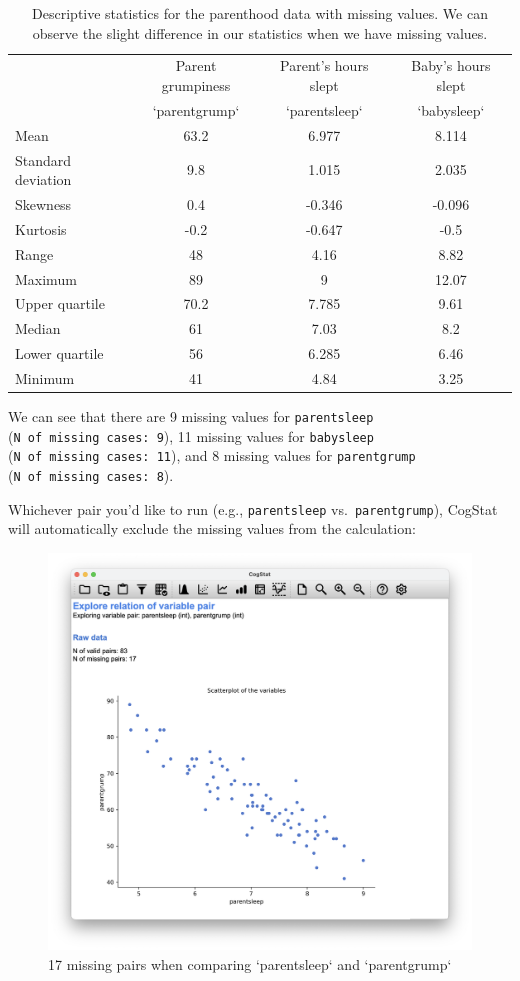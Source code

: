 \documentclass[
  11pt,
  a4paper,
  twoside,symmetric,openright]{book}
\theoremstyle{break}
\theoremstyle{break}
\begin{document}
\begin{table}

\caption{\label{tab:parenthoodmissingtab}Descriptive statistics for the parenthood data with missing values. We can observe the slight difference in our statistics when we have missing values.}
\centering
\begin{tabular}[t]{lccc}
\toprule
\multicolumn{1}{c}{ } & \multicolumn{1}{c}{Parent grumpiness} & \multicolumn{1}{c}{Parent's hours slept} & \multicolumn{1}{c}{Baby's hours slept} \\
\cmidrule(l{3pt}r{3pt}){2-2} \cmidrule(l{3pt}r{3pt}){3-3} \cmidrule(l{3pt}r{3pt}){4-4}
  & `parentgrump` & `parentsleep` & `babysleep`\\
\midrule
Mean & 63.2 & 6.977 & 8.114\\
Standard deviation & 9.8 & 1.015 & 2.035\\
Skewness & 0.4 & -0.346 & -0.096\\
Kurtosis & -0.2 & -0.647 & -0.5\\
Range & 48 & 4.16 & 8.82\\
Maximum & 89 & 9 & 12.07\\
Upper quartile & 70.2 & 7.785 & 9.61\\
Median & 61 & 7.03 & 8.2\\
Lower quartile & 56 & 6.285 & 6.46\\
Minimum & 41 & 4.84 & 3.25\\
\bottomrule
\end{tabular}
\end{table}

We can see that there are 9 missing values for \texttt{parentsleep} (\texttt{N\ of\ missing\ cases:\ 9}), 11 missing values for \texttt{babysleep} (\texttt{N\ of\ missing\ cases:\ 11}), and 8 missing values for \texttt{parentgrump} (\texttt{N\ of\ missing\ cases:\ 8}).

Whichever pair you'd like to run (e.g., \texttt{parentsleep} vs.~\texttt{parentgrump}), CogStat will automatically exclude the missing values from the calculation:

\begin{figure}

{\centering \includegraphics[width=0.6\linewidth]{resources/image/cogstatparentsleepparentgrumpmissing} 

}

\caption{17 missing pairs when comparing `parentsleep` and `parentgrump`}\label{fig:parenthoodmissingcog1}
\end{figure}
\end{document}
